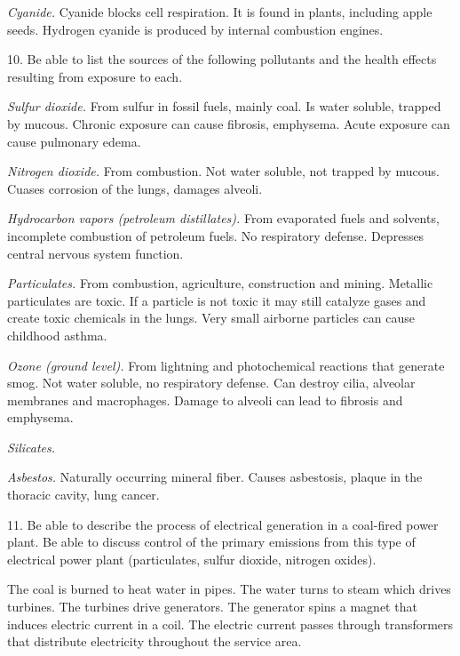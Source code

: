 {\it Cyanide.}
Cyanide blocks cell respiration.
It is found in plants, including apple seeds.
Hydrogen cyanide is produced by internal combustion engines.

\bigskip
\item{10.}
Be able to list the sources of the following pollutants and the
health effects resulting from exposure to each.

{\it Sulfur dioxide.}
From sulfur in fossil fuels, mainly coal.
Is water soluble, trapped by mucous.
Chronic exposure can cause fibrosis, emphysema.
Acute exposure can cause pulmonary edema.

{\it Nitrogen dioxide.}
From combustion.
Not water soluble, not trapped by mucous.
Cuases corrosion of the lungs, damages alveoli.

{\it Hydrocarbon vapors (petroleum distillates).}
From evaporated fuels and solvents, incomplete
combustion of petroleum fuels.
No respiratory defense.
Depresses central nervous system function.

{\it Particulates.}
From combustion, agriculture, construction and mining.
Metallic particulates are toxic.
If a particle is not toxic it may still catalyze gases
and create toxic chemicals in the lungs.
Very small airborne particles can cause childhood asthma.

{\it Ozone (ground level).}
From lightning and photochemical reactions that generate smog.
Not water soluble, no respiratory defense.
Can destroy cilia, alveolar membranes and macrophages.
Damage to alveoli can lead to fibrosis and emphysema.

{\it Silicates.}

{\it Asbestos.}
Naturally occurring mineral fiber.
Causes asbestosis, plaque in the thoracic cavity, lung cancer.

\bigskip
\item{11.}
Be able to describe the process of electrical generation in a
coal-fired power plant.
Be able to discuss control of the primary emissions from this
type of electrical power plant (particulates, sulfur dioxide,
nitrogen oxides).

\item{}
The coal is burned to heat water in pipes.
The water turns to steam which drives turbines.
The turbines drive generators.
The generator spins a magnet that induces electric
current in a coil.
The electric current passes through transformers that
distribute electricity throughout the service area.

